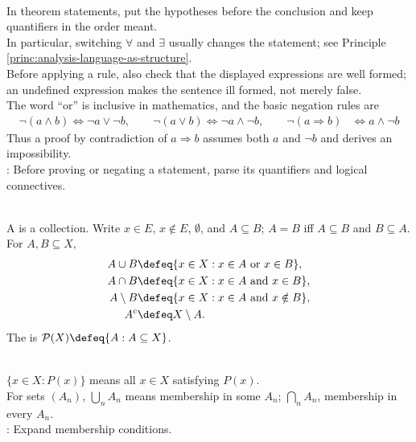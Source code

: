 \begin{method} \label{meth:proof-grammar-and-negation} \\
In theorem statements, put the hypotheses before the conclusion and keep quantifiers in the order meant.\\
In particular, switching $\forall$ and $\exists$ usually changes the statement; see Principle \ref{princ:analysis-language-as-structure}.\\
Before applying a rule, also check that the displayed expressions are well formed; an undefined expression makes the sentence ill formed, not merely false.\\
The word ``or'' is inclusive in mathematics, and the basic negation rules are
\begin{align}
\neg(a\land b)\Longleftrightarrow \neg a\lor\neg b, \qquad \neg(a\lor b)\Longleftrightarrow \neg a\land\neg b, \qquad \neg(a\Rightarrow b)&\Longleftrightarrow a\land\neg b \nonumber
\end{align}
Thus a proof by contradiction of $a\Rightarrow b$ assumes both $a$ and $\neg b$ and derives an impossibility.\\
: Before proving or negating a statement, parse its quantifiers and logical connectives.
\end{method}

\begin{definition} \label{def:analysis-sets-and-operations} \\
A  is a collection. Write $x\in E$, $x\notin E$, $\emptyset$, and $A\subseteq B$; $A=B$ iff $A\subseteq B$ and $B\subseteq A$. For $A,B\subseteq X$,
\begin{align}
A\cup B &\defeq \{x\in X:x\in A\text{ or }x\in B\}, \nonumber\\
A\cap B &\defeq \{x\in X:x\in A\text{ and }x\in B\}, \nonumber\\
A\setminus B &\defeq \{x\in X:x\in A\text{ and }x\notin B\}, \nonumber\\
A^c &\defeq X\setminus A. \nonumber
\end{align}
The  is $\mathcal{P}(X)\defeq\{A:A\subseteq X\}$.
\end{definition}

\begin{remark} \label{rem:set-builder-notation} \\
$\{x\in X:P(x)\}$ means all $x\in X$ satisfying $P(x)$.\\
For sets $(A_n)$, $\bigcup_nA_n$ means membership in some $A_n$; $\bigcap_nA_n$, membership in every $A_n$.\\
: Expand membership conditions.
\end{remark}


